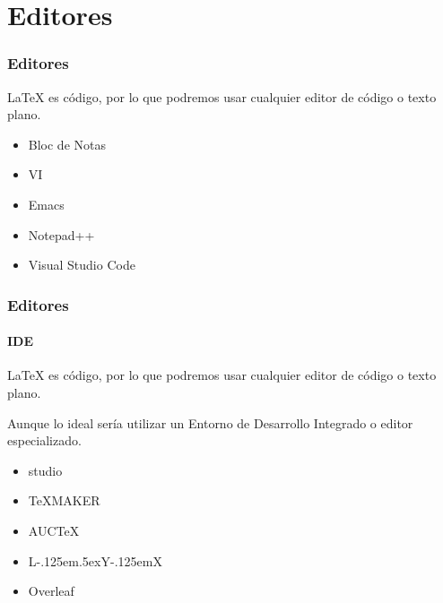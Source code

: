 \documentclass[12pt,aspectratio=169,ignorenonframetext]{ltxbeamer}
\begin{document}
\section{Editores}

\begin{frame}
\frametitle{Editores}

{\lmr\LaTeX} es código, por lo que podremos usar cualquier editor de código o texto plano.

\pause

\begin{itemize}[<+->]
    \item Bloc de Notas
    \item VI
    \item Emacs
    \item Notepad++
    \item Visual Studio Code
\end{itemize}
\end{frame}

\begin{frame}
\frametitle{Editores}
\framesubtitle{IDE}

{\lmr\LaTeX} es código, por lo que podremos usar cualquier editor de código o texto plano.

Aunque lo ideal sería utilizar un Entorno de Desarrollo Integrado o editor especializado.

\pause

\begin{itemize}[<+->]
    \item {\lmr\raisebox{0.5ex}{\TeX}\selectfont studio}
    \item {\lmr\TeX MAKER}
    \item {\lmr AUC\TeX}
    \item {\lmr L\kern-.125em\lower.5ex\hbox{Y}\kern-.125emX}
    \item Overleaf
\end{itemize}
\end{frame}
\end{document}
